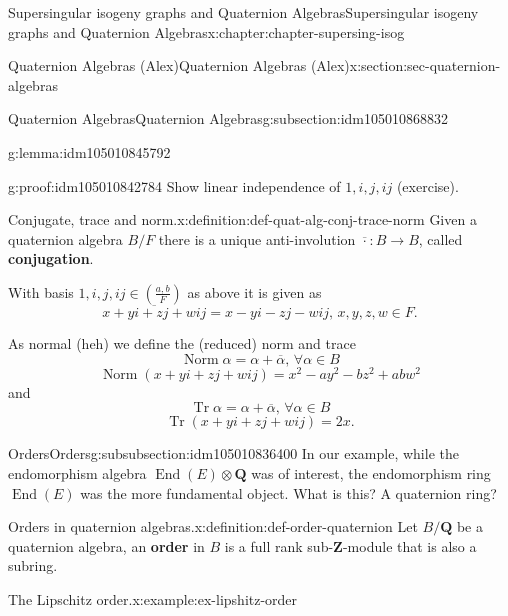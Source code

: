 \documentclass[oneside,10pt,]{book}
\newcommand{\terminology}[1]{\textbf{#1}}
\numberwithin{equation}{section}
\newcommand{\legendre}[2]{\left(\frac{#1}{#2}\right)}
\newcommand{\ZZ}{\mathbf{Z}}
\newcommand{\QQ}{\mathbf{Q}}
\DeclareMathOperator{\End}{End}
\DeclareMathOperator{\norm}{Norm}
\DeclareMathOperator{\trace}{Tr}
\begin{document}
\begin{chapterptx}{Supersingular isogeny graphs and Quaternion Algebras}{}{Supersingular isogeny graphs and Quaternion Algebras}{}{}{x:chapter:chapter-supersing-isog}
\begin{sectionptx}{Quaternion Algebras (Alex)}{}{Quaternion Algebras (Alex)}{}{}{x:section:sec-quaternion-algebras}
\begin{subsectionptx}{Quaternion Algebras}{}{Quaternion Algebras}{}{}{g:subsection:idm105010868832}
\begin{introduction}{}
\begin{lemma}{}{}{g:lemma:idm105010845792}
\end{lemma}
\begin{proofptx}{}{g:proof:idm105010842784}
Show linear independence of \(1,i,j,ij\) (exercise).%
\end{proofptx}
\begin{definition}{Conjugate, trace and norm.}{x:definition:def-quat-alg-conj-trace-norm}%
Given a quaternion algebra \(B/F\) there is a unique anti-involution \(\overline \cdot \colon B \to B\), called \terminology{conjugation}.%
\par
With basis \(1,i,j,ij\in \legendre{a,b}{F}\) as above it is given as%
\begin{equation*}
\overline {x + yi + zj + w ij} = x - yi - zj - w ij,\,x,y,z,w\in F\text{.}
\end{equation*}
%
\par
As normal (heh) we define the (reduced) norm and trace%
\begin{equation*}
\norm \alpha =  \alpha + \overline \alpha,\,\forall \alpha \in B
\end{equation*}
%
\begin{equation*}
\norm(x + yi + zj + w ij) = x^2 - ay^2 - b z^2 + ab w^2
\end{equation*}
and%
\begin{equation*}
\trace \alpha =  \alpha + \overline \alpha,\,\forall \alpha \in B
\end{equation*}
%
\begin{equation*}
\trace (x + yi + zj + w ij) = 2x\text{.}
\end{equation*}
%
\end{definition}
\end{introduction}%
%
%
\typeout{************************************************}
\typeout{************************************************}
%
\begin{subsubsectionptx}{Orders}{}{Orders}{}{}{g:subsubsection:idm105010836400}
In our example, while the endomorphism algebra \(\End(E)\otimes \QQ\) was of interest, the endomorphism ring \(\End(E)\) was the more fundamental object. What is this? A quaternion ring?%
\begin{definition}{Orders in quaternion algebras.}{x:definition:def-order-quaternion}%
Let \(B/\QQ\) be a quaternion algebra, an \terminology{order} in \(B\) is a full rank sub-\(\ZZ\)-module that is also a subring.%
\end{definition}
\begin{example}{The Lipschitz order.}{x:example:ex-lipshitz-order}%

\end{example}
\end{subsubsectionptx}
\end{subsectionptx}
\end{sectionptx}
\end{chapterptx}
\end{document}
